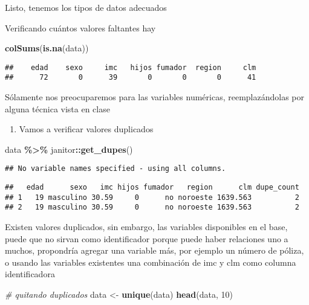 \documentclass[
]{article}
\newenvironment{Shaded}{\begin{snugshade}}{\end{snugshade}}
\newcommand{\CommentTok}[1]{\textcolor[rgb]{0.56,0.35,0.01}{\textit{#1}}}
\newcommand{\DecValTok}[1]{\textcolor[rgb]{0.00,0.00,0.81}{#1}}
\newcommand{\FunctionTok}[1]{\textcolor[rgb]{0.13,0.29,0.53}{\textbf{#1}}}
\newcommand{\NormalTok}[1]{#1}
\newcommand{\OtherTok}[1]{\textcolor[rgb]{0.56,0.35,0.01}{#1}}
\newcommand{\SpecialCharTok}[1]{\textcolor[rgb]{0.81,0.36,0.00}{\textbf{#1}}}
\providecommand{\tightlist}{%
  \setlength{\itemsep}{0pt}\setlength{\parskip}{0pt}}
\begin{document}
Listo, tenemos los tipos de datos adecuados

Verificando cuántos valores faltantes hay

\begin{Shaded}
\begin{Highlighting}[]
\FunctionTok{colSums}\NormalTok{(}\FunctionTok{is.na}\NormalTok{(data))}
\end{Highlighting}
\end{Shaded}

\begin{verbatim}
##    edad    sexo     imc   hijos fumador  region     clm 
##      72       0      39       0       0       0      41
\end{verbatim}

Sólamente nos preocuparemos para las variables numéricas,
reemplazándolas por alguna técnica vista en clase

\begin{enumerate}
\def\labelenumi{\arabic{enumi}.}
\setcounter{enumi}{1}
\tightlist
\item
  Vamos a verificar valores duplicados
\end{enumerate}

\begin{Shaded}
\begin{Highlighting}[]
\NormalTok{data }\SpecialCharTok{\%\textgreater{}\%}\NormalTok{ janitor}\SpecialCharTok{::}\FunctionTok{get\_dupes}\NormalTok{()}
\end{Highlighting}
\end{Shaded}

\begin{verbatim}
## No variable names specified - using all columns.
\end{verbatim}

\begin{verbatim}
##   edad      sexo   imc hijos fumador   region      clm dupe_count
## 1   19 masculino 30.59     0      no noroeste 1639.563          2
## 2   19 masculino 30.59     0      no noroeste 1639.563          2
\end{verbatim}

Existen valores duplicados, sin embargo, las variables disponibles en el
base, puede que no sirvan como identificador porque puede haber
relaciones uno a muchos, propondría agregar una variable más, por
ejemplo un número de póliza, o usando las variables existentes una
combinación de imc y clm como columna identificadora

\begin{Shaded}
\begin{Highlighting}[]
\CommentTok{\# quitando duplicados}
\NormalTok{data }\OtherTok{\textless{}{-}} \FunctionTok{unique}\NormalTok{(data)}
\FunctionTok{head}\NormalTok{(data, }\DecValTok{10}\NormalTok{)}
\end{Highlighting}
\end{Shaded}
\end{document}
